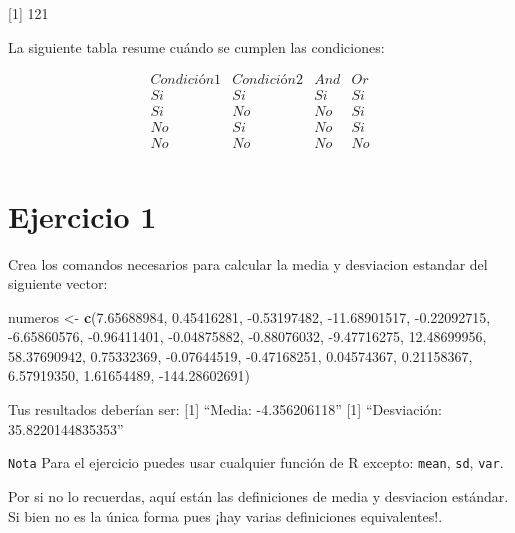 \documentclass[
]{book}
\newenvironment{Shaded}{\begin{snugshade}}{\end{snugshade}}
\newcommand{\FloatTok}[1]{\textcolor[rgb]{0.00,0.00,0.81}{#1}}
\newcommand{\KeywordTok}[1]{\textcolor[rgb]{0.13,0.29,0.53}{\textbf{#1}}}
\newcommand{\NormalTok}[1]{#1}
\newcommand{\StringTok}[1]{\textcolor[rgb]{0.31,0.60,0.02}{#1}}
\newenvironment{Recuadro}
{\begin{mdframed}[
  linecolor=recuadrocolor,
  skipabove=12pt,
  skipbelow=12pt,
  roundcorner=20pt,
  splittopskip=2\topsep]}
{\end{mdframed}}
\begin{document}
{[}1{]} 121

La siguiente tabla resume cuándo se cumplen las condiciones:

\[
\begin{array}{ccccc} 
Condición 1 & Condición 2 & And & Or \\
\hline
Si & Si & Si & Si \\ 
Si & No & No & Si \\ 
No & Si & No & Si \\ 
No & No & No & No \\ 
\end{array}
\]

\hypertarget{ejercicio-1-1}{%
\section{Ejercicio 1}\label{ejercicio-1-1}}

Crea los comandos necesarios para calcular la media y desviacion estandar del siguiente vector:

\begin{Shaded}
\begin{Highlighting}[]
\NormalTok{numeros <-}\StringTok{ }\KeywordTok{c}\NormalTok{(}\FloatTok{7.65688984}\NormalTok{, }\FloatTok{0.45416281}\NormalTok{, }\FloatTok{-0.53197482}\NormalTok{, }\FloatTok{-11.68901517}\NormalTok{, }
             \FloatTok{-0.22092715}\NormalTok{, }\FloatTok{-6.65860576}\NormalTok{, }\FloatTok{-0.96411401}\NormalTok{, }\FloatTok{-0.04875882}\NormalTok{, }
             \FloatTok{-0.88076032}\NormalTok{, }\FloatTok{-9.47716275}\NormalTok{, }\FloatTok{12.48699956}\NormalTok{, }\FloatTok{58.37690942}\NormalTok{, }
             \FloatTok{0.75332369}\NormalTok{, }\FloatTok{-0.07644519}\NormalTok{, }\FloatTok{-0.47168251}\NormalTok{, }\FloatTok{0.04574367}\NormalTok{, }
             \FloatTok{0.21158367}\NormalTok{, }\FloatTok{6.57919350}\NormalTok{, }\FloatTok{1.61654489}\NormalTok{, }\FloatTok{-144.28602691}\NormalTok{)}
\end{Highlighting}
\end{Shaded}

Tus resultados deberían ser:
{[}1{]} ``Media: -4.356206118''
{[}1{]} ``Desviación: 35.8220144835353''

\texttt{Nota} Para el ejercicio puedes usar cualquier función de R excepto: \texttt{mean}, \texttt{sd}, \texttt{var}.

\begin{Recuadro}
Por si no lo recuerdas, aquí están las definiciones de media y
desviacion estándar. Si bien no es la única forma pues ¡hay varias
definiciones equivalentes!.
\end{Recuadro}
\end{document}
